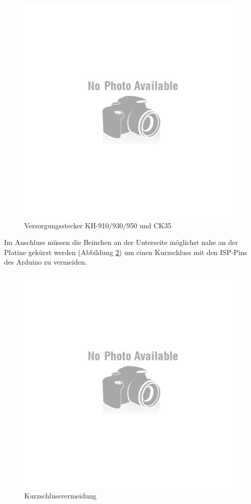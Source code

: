 \documentclass[fleqn,10pt]{SelfArx} %
\begin{document}
\begin{figure}[tbhp]\centering
\includegraphics[width=\linewidth]{no}
\caption{Versorgungsstecker KH-910/930/950 und CK35}
\label{fig:abb8_1}
\end{figure}

Im Anschluss müssen die Beinchen an der Unterseite möglichst nahe an der Platine gekürzt werden (Abbildung \ref{fig:abb8_2}) um einen Kurzschluss mit den ISP-Pins des Arduino zu vermeiden.\par

\begin{figure}[tbhp]\centering
\includegraphics[width=\linewidth]{no}
\caption{Kurzschlussvermeidung}
\label{fig:abb8_2}
\end{figure}
\end{document}
